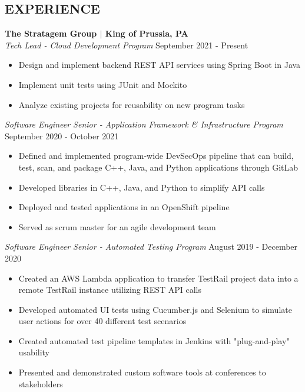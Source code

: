 \documentclass[line,resmargin,11pt]{res}
\begin{document}
\begin{resume}
\section{EXPERIENCE}
\textbf{The Stratagem Group $|$ King of Prussia, PA} \\
{\sl Tech Lead - Cloud Development Program} \hfill September 2021 - Present
	\begin{itemize} \itemsep -2pt %
        \item Design and implement backend REST API services using Spring Boot in Java
        \item Implement unit tests using JUnit and Mockito
		\item Analyze existing projects for reusability on new program tasks
	\end{itemize}

{\sl Software Engineer Senior - Application Framework \& Infrastructure Program} \hfill September 2020 - October 2021
	\begin{itemize} \itemsep -2pt %
		\item Defined and implemented program-wide DevSecOps pipeline that can build, test, scan, and package C++, Java, and Python applications through GitLab
		\item Developed libraries in C++, Java, and Python to simplify API calls
		\item Deployed and tested applications in an OpenShift pipeline
		\item Served as scrum master for an agile development team
	\end{itemize}

{\sl Software Engineer Senior - Automated Testing Program} \hfill August 2019 - December 2020
	\begin{itemize} \itemsep -2pt %
		\item Created an AWS Lambda application to transfer TestRail project data  into a remote TestRail instance utilizing REST API calls
		\item Developed automated UI tests using Cucumber.js and Selenium to simulate user actions for over 40 different test scenarios
		\item Created automated test pipeline templates in Jenkins with "plug-and-play" usability
		\item Presented and demonstrated custom software tools at conferences to stakeholders
	\end{itemize}
	

\end{resume}
\end{document}
